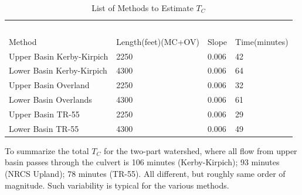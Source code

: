 \documentclass[12pt]{article}
\begin{document}
\begin{enumerate}
\begin{table}[h!]
\centering
\caption{List of Methods to Estimate $T_C$}
\begin{tabular}{p{2.0in}p{2.0in}p{1.0in}p{1.0in}} %
~&~&~\\
Method&Length(feet)(MC+OV)&Slope&Time(minutes)\\
\hline
\hline
Upper Basin Kerby-Kirpich&2250 &0.006&42\\
Lower Basin Kerby-Kirpich&4300 &0.006&64\\
\hline
Upper Basin Overland& 2250 &0.006&32\\
Lower Basin Overlands& 4300 &0.006&61\\
\hline
Upper Basin TR-55&2250 &0.006&29\\
Lower Basin TR-55&4300 &0.006&49\\
\hline
\end{tabular}
\label{tab:TimesTable}
\end{table}

To summarize the total $T_C$ for the two-part watershed, where all flow from upper basin passes through the culvert is 106 minutes (Kerby-Kirpich); 93 minutes (NRCS Upland); 78 minutes (TR-55).  All different, but roughly same order of magnitude.  Such variability is typical for the various methods.

\end{enumerate}


\end{document}
